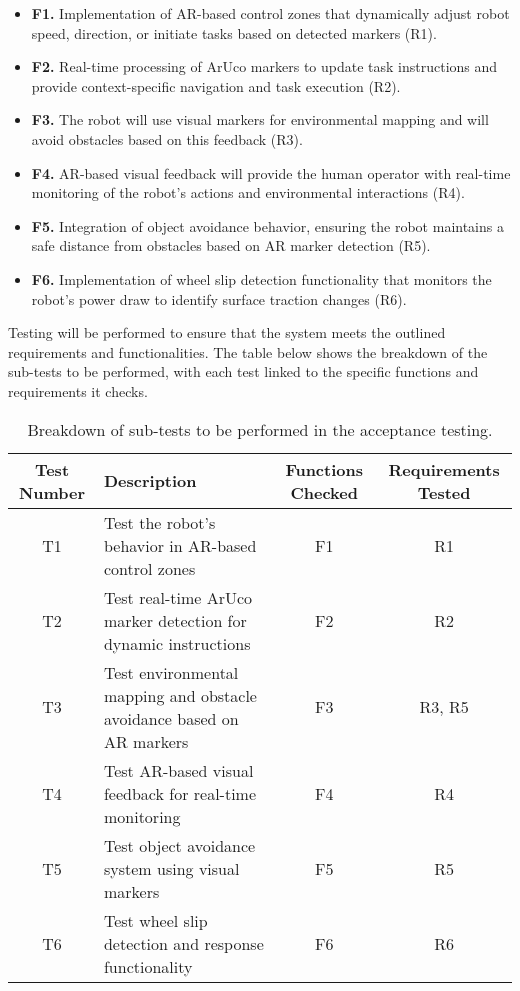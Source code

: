 \begin{itemize}
    \item \textbf{F1.} Implementation of AR-based control zones that dynamically adjust robot speed, direction, or initiate tasks based on detected markers (R1).
    \item \textbf{F2.} Real-time processing of ArUco markers to update task instructions and provide context-specific navigation and task execution (R2).
    \item \textbf{F3.} The robot will use visual markers for environmental mapping and will avoid obstacles based on this feedback (R3).
    \item \textbf{F4.} AR-based visual feedback will provide the human operator with real-time monitoring of the robot’s actions and environmental interactions (R4).
    \item \textbf{F5.} Integration of object avoidance behavior, ensuring the robot maintains a safe distance from obstacles based on AR marker detection (R5).
    \item \textbf{F6.} Implementation of wheel slip detection functionality that monitors the robot's power draw to identify surface traction changes (R6).
\end{itemize}

Testing will be performed to ensure that the system meets the outlined requirements and functionalities. The table below shows the breakdown of the sub-tests to be performed, with each test linked to the specific functions and requirements it checks.

\begin{table}[ht]
\centering
\caption{Breakdown of sub-tests to be performed in the acceptance testing.}
\label{tab:testing}
\begin{tabular}{|c|p{5cm}|c|c|}
\hline
\textbf{Test Number} & \textbf{Description} & \textbf{Functions Checked} & \textbf{Requirements Tested} \\ \hline
T1                   & Test the robot’s behavior in AR-based control zones   & F1  & R1   \\ \hline
T2                   & Test real-time ArUco marker detection for dynamic instructions & F2  & R2   \\ \hline
T3                   & Test environmental mapping and obstacle avoidance based on AR markers & F3  & R3, R5 \\ \hline
T4                   & Test AR-based visual feedback for real-time monitoring & F4  & R4   \\ \hline
T5                   & Test object avoidance system using visual markers   & F5  & R5   \\ \hline
T6                   & Test wheel slip detection and response functionality & F6  & R6   \\ \hline
\end{tabular}
\end{table}


